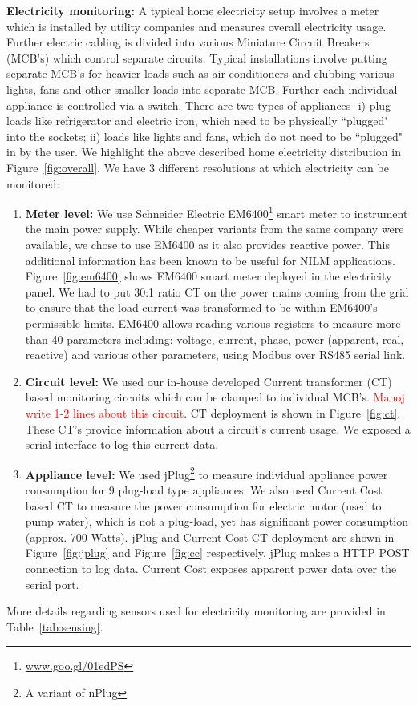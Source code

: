 \documentclass[10pt]{sensys-proc}
\newcommand{\redcolor}[1]{\textcolor{red}{#1}}
\newcommand{\figref}[1]{Figure~\ref{#1}}
\newcommand{\tabref}[1]{Table~\ref{#1}}
\begin{document}
\noindent\textbf{Electricity monitoring:} A typical home electricity setup involves a meter which is installed by utility companies and measures overall electricity usage. Further electric cabling is divided into various Miniature Circuit Breakers (MCB's) which control separate circuits. Typical installations involve putting separate MCB's for heavier loads such as air conditioners and clubbing various lights, fans and other smaller loads into separate MCB. Further each individual appliance is controlled via a switch. There are two types of appliances- i) plug loads like refrigerator and electric iron, which need to be physically ``plugged" into the sockets; ii) loads like lights and fans, which do not need to be ``plugged" in by the user. We highlight the above described home electricity distribution in \figref{fig:overall}. We have 3 different resolutions at which electricity can be monitored:
\begin{enumerate}
\item \textbf{Meter level:} We use Schneider Electric EM6400\footnote{\url{www.goo.gl/01edPS}} smart meter to instrument the main power supply. While cheaper variants from the same company were available, we chose to use EM6400 as it also provides reactive power. This additional information has been known to be useful for NILM applications\cite{hart}. \figref{fig:em6400} shows EM6400 smart meter deployed in the electricity panel. We had to put 30:1 ratio CT on the power mains coming from the grid to ensure that the load current was transformed to be within EM6400's permissible limits. EM6400 allows reading various registers to measure more than 40 parameters including: voltage, current, phase, power (apparent, real, reactive) and various other parameters, using Modbus over RS485 serial link.

\item \textbf{Circuit level:} We used our in-house developed Current transformer (CT) based monitoring circuits which can be clamped to individual MCB's. \redcolor{Manoj write 1-2 lines about this circuit}. CT deployment is shown in \figref{fig:ct}. These CT's provide information about a circuit's current usage. We exposed a serial interface to log this current data.

\item \textbf{Appliance level:} We used jPlug\footnote{A variant of nPlug\cite{nplug}} to measure individual appliance power consumption for 9 plug-load type appliances. We also used Current Cost based CT to measure the power consumption for electric motor (used to pump water), which is not a plug-load, yet has significant power consumption (approx. 700 Watts). jPlug and Current Cost CT deployment are shown in \figref{fig:jplug} and \figref{fig:cc} respectively. jPlug makes a HTTP POST connection to log data. Current Cost exposes apparent power data over the serial port.
\end{enumerate}
More details regarding sensors used for electricity monitoring are provided in \tabref{tab:sensing}.
\end{document}
